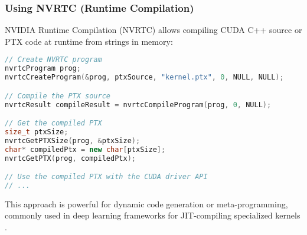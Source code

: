 \subsubsection{Using NVRTC (Runtime Compilation)}

NVIDIA Runtime Compilation (NVRTC) allows compiling CUDA C++ source or PTX code at runtime from strings in memory:

\begin{lstlisting}[language=C++]
// Create NVRTC program
nvrtcProgram prog;
nvrtcCreateProgram(&prog, ptxSource, "kernel.ptx", 0, NULL, NULL);

// Compile the PTX source
nvrtcResult compileResult = nvrtcCompileProgram(prog, 0, NULL);

// Get the compiled PTX
size_t ptxSize;
nvrtcGetPTXSize(prog, &ptxSize);
char* compiledPtx = new char[ptxSize];
nvrtcGetPTX(prog, compiledPtx);

// Use the compiled PTX with the CUDA driver API
// ...
\end{lstlisting}

This approach is powerful for dynamic code generation or meta-programming, commonly used in deep learning frameworks for JIT-compiling specialized kernels \citep{llvm_nvptx_guide}.

